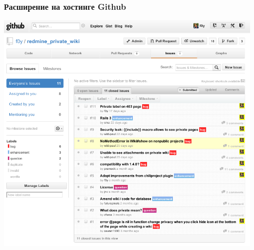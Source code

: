 \documentclass[unicode]{beamer}
\begin{document}
\begin{frame}
\transwipe[direction=90]
\frametitle{Расширение на хостинге Github}
\centerline{\includegraphics[scale=0.4]{private-wiki-on-github.png}}
\end{frame}

\end{document}
